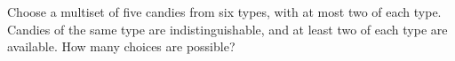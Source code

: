 Choose a multiset of five candies from six types, with at most two of each type. Candies of the same type are indistinguishable, and at least two of each type are available. How many choices are possible?
